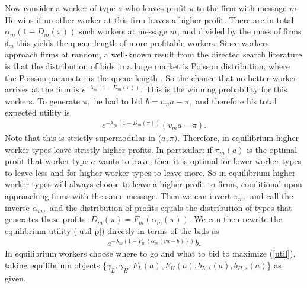 \documentclass[12pt]{article}
\begin{document}
Now consider a worker of type $a$ who leaves profit $\pi $ to the firm with message $m$.
He wins if no other worker at this firm leaves a higher profit.
There are in total $\alpha _{m}(1-D_{m}(\pi ))$ such workers at message $m$, and divided by the mass of firms $\delta _{m}$ this yields the queue length of more profitable workers.
Since workers approach firms at random, a well-known result from the directed search literature is that the distribution of bids in a large market is Poisson distribution, where the Poisson parameter is the queue length \cite{TK}.
So the chance that no better worker arrives at the firm is $e^{-\lambda _{m}(1-D_{m}(\pi ))}.$
This is the winning probability for this workers.
To generate $\pi ,$ he had to bid $b=v_{m}a-\pi ,$ and therefore his total expected utility is 
\begin{align} \label{util-p}
e^{-\lambda _{m}(1-D_{m}(\pi ))}(v_{m}a-\pi ).  
\end{align}%
Note that this is strictly supermodular in ($a,\pi ).$
Therefore, in equilibrium higher worker types leave strictly higher profits.
In particular: if $\pi _{m}(a)$ is the optimal profit that worker type $a$ wants to leave, then it is optimal for lower worker types to leave less and for higher worker types to leave more. So in equilibrium higher worker types will always choose to leave a higher profit to firms, conditional upon approaching firms with the same message.
Then we can invert $\pi _{m},$ and call the inverse $\alpha _{m},$ and the distribution of profits equals the distribution of types that generates these profits:
$D_{m}(\pi )=F_{m}(\alpha _{m}(\pi )).$
We can then rewrite the equilibrium utility (\ref{util-p}) directly in terms of the bids as 
\begin{align} \label{util}
e^{-\lambda _{m}(1-F_{m}(\alpha _{m}(va-b)))}b.  
\end{align}%
In equilibrium workers choose where to go and what to bid to maximize (\ref{util}), taking equilibrium objects \{$\gamma _{L},\gamma_{H},F_{L}(a),F_{H}(a),b_{L,s}(a),b_{H,s}(a)$\} as given.
\end{document}
